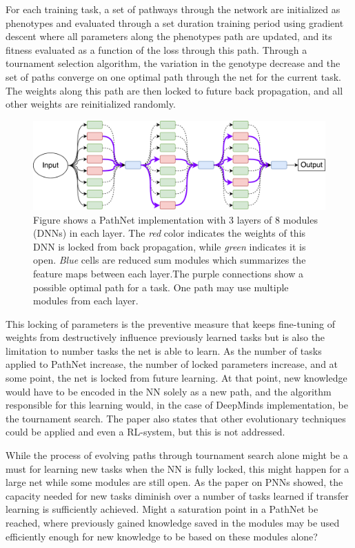 \documentclass[a4paper,english]{report}
\begin{document}
For each training task, a set of pathways through the network are initialized as phenotypes and evaluated through a set duration training period using gradient descent where all parameters along the phenotypes path are updated, and its fitness evaluated as a function of the loss through this path. Through a tournament selection algorithm, the variation in the genotype decrease and the set of paths converge on one optimal path through the net for the current task. The weights along this path are then locked to future back propagation, and all other weights are reinitialized randomly.
\begin{figure}[t]
    \label{fig:pathnet}
    \includegraphics[width=\textwidth]{figures/PathNet.pdf}
    \caption{Figure shows a PathNet implementation with 3 layers of 8 modules (DNNs) in each layer. The \textit{red} color indicates the weights of this DNN is locked from back propagation, while \textit{green} indicates it is open. \textit{Blue} cells are reduced sum modules which summarizes the feature maps between each layer.The purple connections show a possible optimal path for a task. One path may use multiple modules from each layer.}
\end{figure}
This locking of parameters is the preventive measure that keeps fine-tuning of weights from destructively influence previously learned tasks but is also the limitation to number tasks the net is able to learn. As the number of tasks applied to PathNet increase, the number of locked parameters increase, and at some point, the net is locked from future learning. At that point, new knowledge would have to be encoded in the NN solely as a new path, and the algorithm responsible for this learning would, in the case of DeepMinds implementation, be the tournament search. The paper also states that other evolutionary techniques could be applied and even a RL-system, but this is not addressed.

While the process of evolving paths through tournament search alone might be a must for learning new tasks when the NN is fully locked, this might happen for a large net while some modules are still open. As the paper on PNNs showed, the capacity needed for new tasks diminish over a number of tasks learned if transfer learning is sufficiently achieved. Might a saturation point in a PathNet be reached, where previously gained knowledge saved in the modules may be used efficiently enough for new knowledge to be based on these modules alone? 
\end{document}
